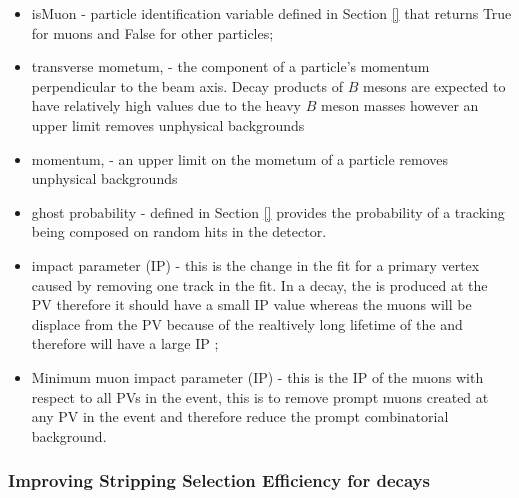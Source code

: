 \begin{itemize}
\item isMuon - particle identification variable defined in Section \ref{} that returns True for muons and False for other particles;
\item transverse mometum, \pt - the component of a particle's momentum perpendicular to the beam axis. Decay products of $B$ mesons are expected to have relatively high \pt values due to the heavy $B$ meson masses however an upper limit removes unphysical backgrounds
\item momentum, \p - an upper limit on the mometum of a particle  removes unphysical backgrounds
\item ghost probability - defined in Section \ref{} provides the probability of a tracking being composed on random hits in the detector.
\item impact parameter (IP) \chisqd - this is the change in the fit for a primary vertex caused by removing one track in the fit. In a \bsmumu decay, the \bs is produced at the PV therefore it should have a small IP \chisqd value whereas the muons will be displace from the PV because of the realtively long lifetime of the \bs and therefore will have a large IP \chisqd;
\item Minimum muon impact parameter (IP) \chisqd - this is the IP \chisqd of the muons with respect to all PVs in the event, this is to remove prompt muons created at any PV in the event and therefore reduce the prompt combinatorial background. 
\end{itemize}



\subsubsection{Improving Stripping Selection Efficiency for \bmumu decays}
\label{strippingstudies}

